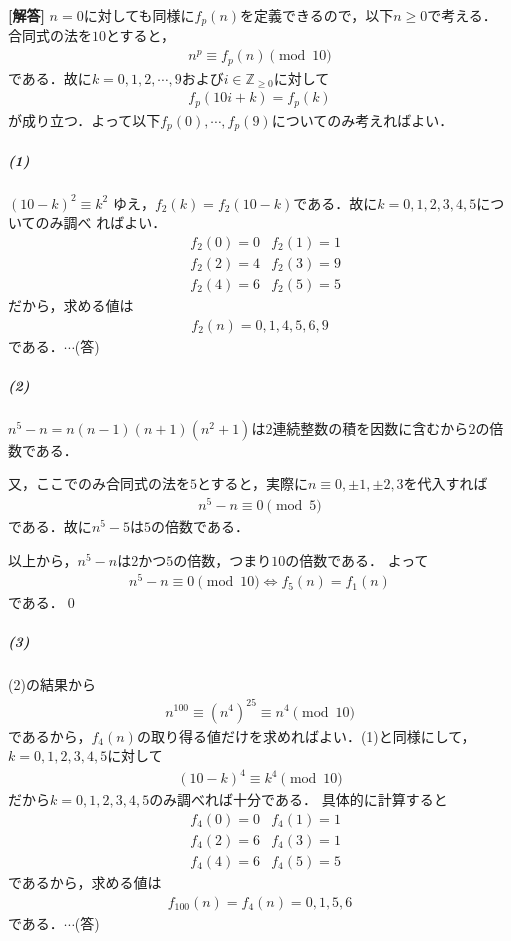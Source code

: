 \documentclass[../../main.tex]{subfiles}
\begin{document}
\begin{oframed}
  
\end{oframed}

{\bf [解答]}
$n=0$に対しても同様に$f_p(n)$を定義できるので，以下$n\ge0$で考える．
合同式の法を$10$とすると，
\begin{align}
  n^p\equiv f_p(n) \pmod 10
\end{align}
である．故に$k=0,1,2,\cdots,9$および$i\in\mathbb{Z}_{\ge0}$に対して
\begin{align}
  f_p(10i+k)=f_p(k)
\end{align}
が成り立つ．よって以下$f_p(0),\cdots,f_p(9)$についてのみ考えればよい．

\subparagraph{(1)}

$(10-k)^2\equiv k^2$ ゆえ，$f_2(k)=f_2(10-k)$である．故に$k=0,1,2,3,4,5$についてのみ調べ
ればよい．
\begin{align}
  &f_2(0)=0 &f_2(1)=1 \\
  &f_2(2)=4 &f_2(3)=9  \\
  &f_2(4)=6 & f_2(5)=5
\end{align}
だから，求める値は
\begin{align}
  f_2(n)=0,1,4,5,6,9
\end{align}
である．$\cdots$(答)

\subparagraph{(2)}

$n^5-n=n(n-1)(n+1)(n^2+1)$は$2$連続整数の積を因数に含むから$2$の倍数である．

又，ここでのみ合同式の法を$5$とすると，実際に$n\equiv0,\pm1,\pm2,3$を代入すれば
\begin{align}
  n^5 - n \equiv 0 \pmod 5
\end{align}
である．故に$n^5-5$は$5$の倍数である．

以上から，$n^5-n$は$2$かつ$5$の倍数，つまり$10$の倍数である．
よって　
\begin{align}
  n^5-n\equiv 0 \pmod 10 \Longleftrightarrow f_5(n)=f_1(n)
\end{align}
である．\qed

\subparagraph{(3)}

(2)の結果から
\begin{align}
  n^{100}\equiv (n^4)^{25}\equiv n^4 \pmod 10
\end{align}
であるから，$f_4(n)$の取り得る値だけを求めればよい．(1)と同様にして，$k=0,1,2,3,4,5$に対して
\begin{align}
  (10-k)^4 \equiv k^4 \pmod 10
\end{align}
だから$k=0,1,2,3,4,5$のみ調べれば十分である．
具体的に計算すると
\begin{align}
  &f_4(0)=0 &f_4(1)=1 \\
  &f_4(2)=6 &f_4(3)=1  \\
  &f_4(4)=6 & f_4(5)=5
\end{align}
であるから，求める値は
\begin{align}
  f_{100}(n)=f_4(n)=0,1,5,6
\end{align}
である．$\cdots$(答)

\newpage
\end{document}

